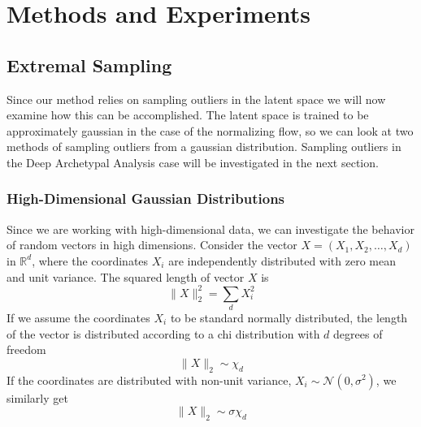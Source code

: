 \chapter{Methods and Experiments}%
\label{cha:methods}



\section{Extremal Sampling}%
\label{sec:extremal_sampling}

Since our method relies on sampling outliers in the latent space we will now
examine how this can be accomplished. The latent space is trained to be
approximately gaussian in the case of the normalizing flow, so we can look at
two methods of sampling outliers from a gaussian distribution. Sampling
outliers in the Deep Archetypal Analysis case will be investigated in the next
section.

\subsection{High-Dimensional Gaussian Distributions}%
\label{sub:high_dimensional_gaussian_distributions}
Since we are working with high-dimensional data, we can investigate the
behavior of random vectors in high dimensions.
Consider the vector $X = (X_1, X_2, \dots, X_d)$ in $\mathbb{R}^d$, where the
coordinates $X_i$ are independently distributed with zero mean and unit
variance. The squared length of vector $X$ is
\begin{equation}%
	\label{eq:square_norm}
	\lVert X \rVert_2^2 = \sum_d X_i^2
\end{equation}
If we assume the coordinates $X_i$ to be standard normally distributed, the
length of the vector is distributed according to a chi distribution with
$d$ degrees of freedom
\begin{equation}%
	\label{eq:sq_norm_chi}
	\lVert X \rVert_2 \sim \chi_d
\end{equation}
If the coordinates are distributed with non-unit variance, $X_i \sim
	\mathcal{N}(0, \sigma^2)$, we similarly get
\begin{equation}%
	\label{eq:sq_norm_chi_sigma}
	\lVert X \rVert_2 \sim \sigma\chi_d
\end{equation}


